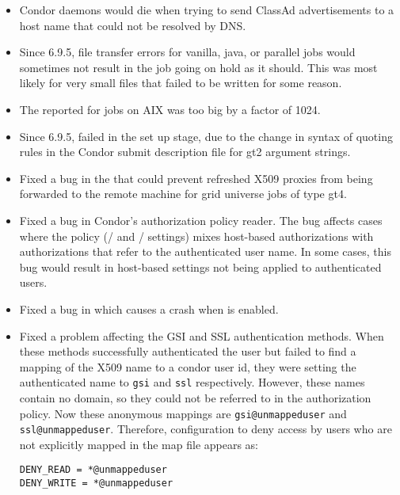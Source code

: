 \begin{itemize}
\item Condor daemons would die when trying to send ClassAd
advertisements to a host name that could not be resolved by DNS.

\item Since 6.9.5, file transfer errors for vanilla, java, or parallel
jobs would sometimes not result in the job going on hold as it should.
This was most likely for very small files that failed to be written
for some reason.

\item The  reported for jobs on AIX was too big by a factor
of 1024.

\item Since 6.9.5,  failed in the set up stage, due to the
change in syntax of quoting rules
in the Condor submit description file for gt2 argument strings.

\item Fixed a bug in the  that could prevent refreshed
X509 proxies from being forwarded to the remote machine for grid universe
jobs of type gt4.

\item Fixed a bug in Condor's authorization policy reader.  The bug
affects cases where the policy (/ and
/ settings) mixes host-based
authorizations with authorizations that refer to the authenticated
user name.  In some cases, this bug would result in host-based
settings not being applied to authenticated users.

\item Fixed a bug in  which causes a crash 
when  is enabled.

\item Fixed a problem affecting the GSI and SSL authentication
methods.  When these methods successfully authenticated the user but
failed to find a mapping of the X509 name to a condor user id, they
were setting the authenticated name to \verb|gsi| and \verb|ssl|
respectively.  However, these names contain no domain, so they could
not be referred to in the authorization policy.  Now these anonymous
mappings are \verb|gsi@unmappeduser| and \verb|ssl@unmappeduser|.
Therefore, configuration to deny access by users who are not explicitly mapped
in the map file appears as:

\begin{verbatim}
DENY_READ = *@unmappeduser
DENY_WRITE = *@unmappeduser
\end{verbatim}

\end{itemize}

